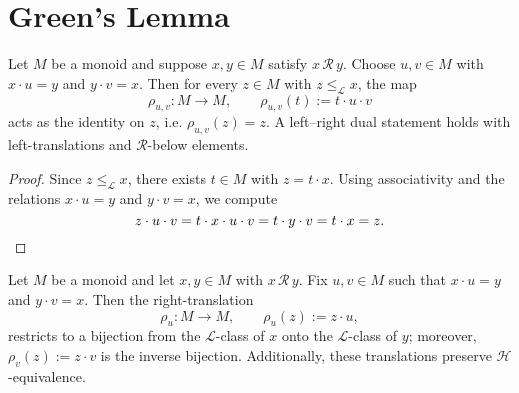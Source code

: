\section{Green’s Lemma}

\begin{lemma}
\label{lem:id-translation}
Let \(M\) be a monoid and suppose \(x,y\in M\) satisfy \(x \,\mathcal R\, y\).  
Choose \(u,v\in M\) with \(x\cdot u = y\) and \(y\cdot v = x\).
Then for every \(z\in M\) with \(z \le_{\mathcal L} x\), the map
\[
\rho_{u,v}\colon M \to M, \qquad \rho_{u,v}(t) := t\cdot u\cdot v
\]
acts as the identity on \(z\), i.e. \(\rho_{u,v}(z) = z\).
A left–right dual statement holds with left-translations and \(\mathcal R\)-below elements.
\end{lemma}

\begin{proof}
Since \(z \le_{\mathcal L} x\), there exists \(t\in M\) with \(z = t\cdot x\).
Using associativity and the relations \(x\cdot u = y\) and \(y\cdot v = x\), we compute
\[
z\cdot u\cdot v
= t\cdot x\cdot u\cdot v
= t\cdot y\cdot v
= t\cdot x
= z.\qedhere
\]
\end{proof}


\begin{lemma}
\label{lem:greens-lemma}
Let \(M\) be a monoid and let \(x,y\in M\) with \(x \,\mathcal R\, y\).
Fix \(u,v\in M\) such that \(x\cdot u = y\) and \(y\cdot v = x\).
Then the right-translation
\[
\rho_u \colon M \to M, \qquad \rho_u(z) := z\cdot u,
\]
restricts to a bijection from the \(\mathcal L\)-class of \(x\) onto the \(\mathcal L\)-class of \(y\);
moreover, \(\rho_v(z):=z\cdot v\) is the inverse bijection.
Additionally, these translations preserve \(\mathcal H\)-equivalence.
\end{lemma}

